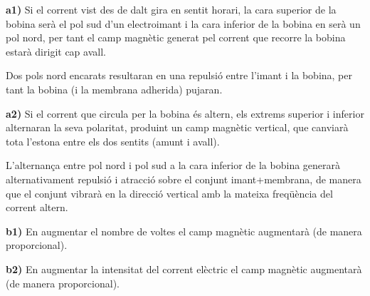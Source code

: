 \begin{solapartat}
 \textbf{a1)} Si el corrent vist des de dalt gira en sentit horari, la cara superior de la bobina serà el pol sud d'un electroimant i la cara inferior de la bobina en serà un pol nord, per tant el camp magnètic generat pel corrent que recorre la bobina estarà dirigit cap avall.

Dos pols nord encarats resultaran en una repulsió entre l'imant i la bobina, per tant la bobina (i la membrana adherida) pujaran.

 \textbf{a2)} Si el corrent que circula per la bobina és altern, els extrems superior i inferior alternaran la seva polaritat, produint un camp magnètic vertical, que canviarà tota l'estona entre els dos sentits (amunt i avall).

L'alternança entre pol nord i pol sud a la cara inferior de la bobina generarà alternativament repulsió i atracció sobre el conjunt imant+membrana, de manera que el conjunt vibrarà en la direcció vertical amb la mateixa freqüència del corrent altern.
\end{solapartat}

\begin{solapartat}
 \textbf{b1)} En augmentar el nombre de voltes el camp magnètic augmentarà (de manera proporcional).

 \textbf{b2)} En augmentar la intensitat del corrent elèctric el camp magnètic augmentarà (de manera proporcional).
\end{solapartat}
